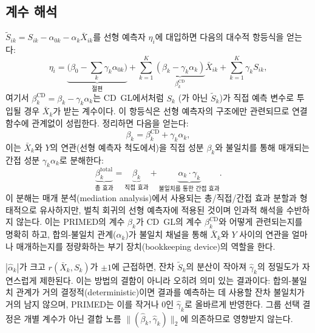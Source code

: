 \documentclass[a4paper,11pt]{article}
\begin{document}
\subsection{계수 해석}\label{sec:properties}

$\tilde S_{ik} = S_{ik} - \alpha_{0k} - \alpha_k \bar X_{ik}$를 선형 예측자 $\eta_i$에 대입하면 다음의 대수적 항등식을 얻는다:
\[
  \eta_i = \underbrace{\bigl(\beta_0 - \textstyle\sum_k \gamma_k \alpha_{0k}\bigr)}_{\text{절편}}
         + \sum_{k=1}^K \underbrace{(\beta_k - \gamma_k \alpha_k)}_{\beta_k^{\mathrm{CD}}} \bar X_{ik}
         + \sum_{k=1}^K \gamma_k S_{ik},
\]
여기서 $\beta_k^{\mathrm{CD}} = \beta_k - \gamma_k \alpha_k$는 CD~GL에서처럼 $S_k$ (가 아닌 $\tilde S_k$)가 직접 예측 변수로 투입될 경우 $\bar X_k$가 받는 계수이다.
이 항등식은 선형 예측자의 구조에만 관련되므로 연결 함수에 관계없이 성립한다.
정리하면 다음을 얻는다:
\begin{equation}\label{eq:coef_relation}
  \beta_k = \beta_k^{\mathrm{CD}} + \gamma_k \alpha_k,
\end{equation}
이는 $\bar X_k$와 $Y$의 연관(선형 예측자 척도에서)을 직접 성분 $\beta_k$와 불일치를 통해 매개되는 간접 성분 $\gamma_k \alpha_k$로 분해한다:
\begin{equation}\label{eq:total_effect}
  \underbrace{\beta_k^{\mathrm{total}}}_{\text{총 효과}} = \underbrace{\beta_k}_{\text{직접 효과}} + \underbrace{\alpha_k \cdot \gamma_k}_{\text{불일치를 통한 간접 효과}}.
\end{equation}
이 분해는 매개 분석(mediation analysis)에서 사용되는 총/직접/간접 효과 분할과 형태적으로 유사하지만, 벌칙 회귀의 선형 예측자에 적용된 것이며 인과적 해석을 수반하지 않는다.
이는 PRIMED의 계수 $\beta_k$가 CD~GL의 계수 $\beta_k^{\mathrm{CD}}$와 어떻게 관련되는지를 명확히 하고, 합의-불일치 관계($\alpha_k$)가 불일치 채널을 통해 $\bar X_k$와 $Y$ 사이의 연관을 얼마나 매개하는지를 정량화하는 부기 장치(bookkeeping device)의 역할을 한다.

$|\hat\alpha_k|$가 크고 $r(\bar X_k, S_k)$가 $\pm 1$에 근접하면, 잔차 $\tilde S_k$의 분산이 작아져 $\hat\gamma_k$의 정밀도가 자연스럽게 제한된다.
이는 방법의 결함이 아니라 오히려 의미 있는 결과이다: 합의-불일치 관계가 거의 결정적(deterministic)이면 결과를 예측하는 데 사용할 잔차 불일치가 거의 남지 않으며, PRIMED는 이를 작거나 0인 $\hat\gamma_k$로 올바르게 반영한다.
그룹 선택 결정은 개별 계수가 아닌 결합 노름 $\|(\hat\beta_k, \hat\gamma_k)\|_2$에 의존하므로 영향받지 않는다.
\end{document}
